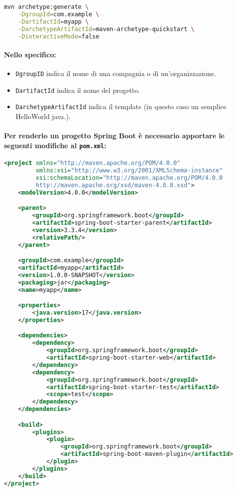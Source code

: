 \begin{lstlisting}[language=bash, caption={Creazione di un progetto Maven}]
mvn archetype:generate \
    -DgroupId=com.example \
    -DartifactId=myapp \
    -DarchetypeArtifactId=maven-archetype-quickstart \
    -DinteractiveMode=false
\end{lstlisting}

\paragraph{Nello specifico:}

\begin{itemize}
  \item \texttt{DgroupID} indica il nome di una compagnia o di un'organizzazione. 
  \item \texttt{DartifactId} indica il nome del progetto. 
  \item \texttt{DarchetypeArtifactId} indica il template (in questo caso un semplice HelloWorld java.).
\end{itemize}

\paragraph{Per renderlo un progetto Spring Boot è necessario apportare le seguenti modifiche al \texttt{pom.xml}:}

\begin{lstlisting}[language=xml, caption={Esempio di pom.xml per Spring Boot}]
<project xmlns="http://maven.apache.org/POM/4.0.0"
         xmlns:xsi="http://www.w3.org/2001/XMLSchema-instance"
         xsi:schemaLocation="http://maven.apache.org/POM/4.0.0
         http://maven.apache.org/xsd/maven-4.0.0.xsd">
    <modelVersion>4.0.0</modelVersion>

    <parent>
        <groupId>org.springframework.boot</groupId>
        <artifactId>spring-boot-starter-parent</artifactId>
        <version>3.3.4</version>
        <relativePath/>
    </parent>

    <groupId>com.example</groupId>
    <artifactId>myapp</artifactId>
    <version>1.0.0-SNAPSHOT</version>
    <packaging>jar</packaging>
    <name>myapp</name>

    <properties>
        <java.version>17</java.version>
    </properties>

    <dependencies>
        <dependency>
            <groupId>org.springframework.boot</groupId>
            <artifactId>spring-boot-starter-web</artifactId>
        </dependency>
        <dependency>
            <groupId>org.springframework.boot</groupId>
            <artifactId>spring-boot-starter-test</artifactId>
            <scope>test</scope>
        </dependency>
    </dependencies>

    <build>
        <plugins>
            <plugin>
                <groupId>org.springframework.boot</groupId>
                <artifactId>spring-boot-maven-plugin</artifactId>
            </plugin>
        </plugins>
    </build>
</project>
\end{lstlisting}
